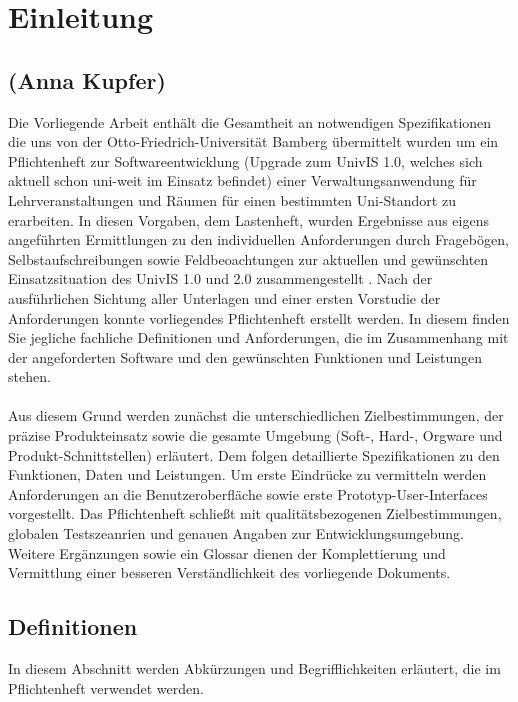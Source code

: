 \section{Einleitung}
\label{sec:Einleitung}

\subsection*{(Anna Kupfer)}

Die Vorliegende Arbeit enthält die Gesamtheit an notwendigen Spezifikationen die uns von der Otto-Friedrich-Universität Bamberg übermittelt wurden um ein Pflichtenheft zur Softwareentwicklung (Upgrade zum UnivIS 1.0, welches sich aktuell schon uni-weit im Einsatz befindet) einer Verwaltungsanwendung für Lehrveranstaltungen und Räumen für einen bestimmten Uni-Standort zu erarbeiten.
In diesen Vorgaben, dem Lastenheft, wurden Ergebnisse aus eigens angeführten Ermittlungen zu den individuellen Anforderungen durch Fragebögen, Selbstaufschreibungen sowie Feldbeoachtungen zur aktuellen und gewünschten Einsatzsituation des UnivIS 1.0 und 2.0 zusammengestellt \cite{Balzert09}.
Nach der ausführlichen Sichtung aller Unterlagen und einer ersten Vorstudie der Anforderungen konnte vorliegendes Pflichtenheft erstellt werden. In diesem finden Sie jegliche fachliche Definitionen und Anforderungen, die im Zusammenhang mit der angeforderten Software und den gewünschten Funktionen und Leistungen stehen.
\\
\\
Aus diesem Grund werden zunächst die unterschiedlichen Zielbestimmungen, der präzise Produkteinsatz sowie die gesamte Umgebung (Soft-, Hard-, Orgware und Produkt-Schnittstellen) erläutert.
Dem folgen detaillierte Spezifikationen zu den Funktionen, Daten und Leistungen. Um erste Eindrücke zu vermitteln werden Anforderungen an die Benutzeroberfläche sowie erste Prototyp-User-Interfaces vorgestellt. Das Pflichtenheft schließt mit qualitätsbezogenen Zielbestimmungen, globalen Testszeanrien und genauen Angaben zur Entwicklungsumgebung.
Weitere Ergänzungen sowie ein Glossar dienen der Komplettierung und Vermittlung einer besseren Verständlichkeit des vorliegende Dokuments.

\subsection{Definitionen}
\label{sec:Definitionen}

In diesem Abschnitt werden Abkürzungen und Begrifflichkeiten erläutert, die im Pflichtenheft verwendet werden. \\[0.25cm]

